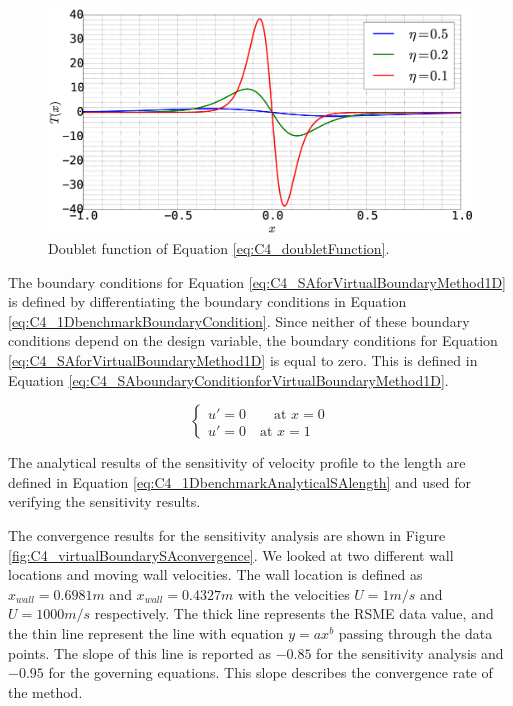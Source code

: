 \begin{figure}[H]
    \centering
    \includegraphics[width=12.00cm]{Chapter_4/figure/doubletFunction.eps}
    \caption{Doublet function of Equation \eqref{eq:C4_doubletFunction}.}
    \label{fig:C4_doubletFunction}
\end{figure}

The boundary conditions for Equation \eqref{eq:C4_SAforVirtualBoundaryMethod1D} is defined by differentiating the boundary conditions in Equation \eqref{eq:C4_1DbenchmarkBoundaryCondition}. Since neither of these boundary conditions depend on the design variable, the boundary conditions for Equation \eqref{eq:C4_SAforVirtualBoundaryMethod1D} is equal to zero. This is defined in Equation \eqref{eq:C4_SAboundaryConditionforVirtualBoundaryMethod1D}.

\begin{equation}\label{eq:C4_SAboundaryConditionforVirtualBoundaryMethod1D}
\begin{cases}
    u' = 0 \qquad \text{at } x = 0 \\
    u' = 0 \quad \text{at } x = 1
\end{cases}
\end{equation}

The analytical results of the sensitivity of velocity profile to the length are defined in Equation \eqref{eq:C4_1DbenchmarkAnalyticalSAlength} and used for verifying the sensitivity results.

The convergence results for the sensitivity analysis are shown in Figure \ref{fig:C4_virtualBoundarySAconvergence}. We looked at two different wall locations and moving wall velocities. The wall location is defined as $x_{wall} = 0.6981 m$ and $x_{wall} = 0.4327 m$ with the velocities $U = 1 m/s$ and $U = 1000 m/s$ respectively. The thick line represents the RSME data value, and the thin line represent the line with equation $y = ax^b$ passing through the data points. The slope of this line is reported as $-0.85$ for the sensitivity analysis and $-0.95$ for the governing equations. This slope describes the convergence rate of the method.

